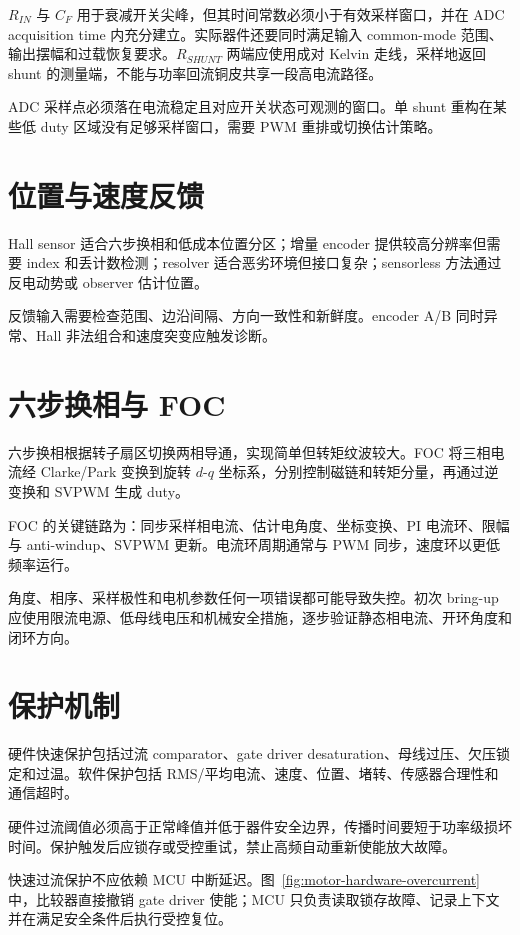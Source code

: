 $R_{IN}$ 与 $C_F$ 用于衰减开关尖峰，但其时间常数必须小于有效采样窗口，并在 ADC acquisition time 内充分建立。实际器件还要同时满足输入 common-mode 范围、输出摆幅和过载恢复要求。$R_{SHUNT}$ 两端应使用成对 Kelvin 走线，采样地返回 shunt 的测量端，不能与功率回流铜皮共享一段高电流路径。

ADC 采样点必须落在电流稳定且对应开关状态可观测的窗口。单 shunt 重构在某些低 duty 区域没有足够采样窗口，需要 PWM 重排或切换估计策略。

\section{位置与速度反馈}

Hall sensor 适合六步换相和低成本位置分区；增量 encoder 提供较高分辨率但需要 index 和丢计数检测；resolver 适合恶劣环境但接口复杂；sensorless 方法通过反电动势或 observer 估计位置。

反馈输入需要检查范围、边沿间隔、方向一致性和新鲜度。encoder A/B 同时异常、Hall 非法组合和速度突变应触发诊断。

\section{六步换相与 FOC}

六步换相根据转子扇区切换两相导通，实现简单但转矩纹波较大。FOC 将三相电流经 Clarke/Park 变换到旋转 $d$-$q$ 坐标系，分别控制磁链和转矩分量，再通过逆变换和 SVPWM 生成 duty。

FOC 的关键链路为：同步采样相电流、估计电角度、坐标变换、PI 电流环、限幅与 anti-windup、SVPWM 更新。电流环周期通常与 PWM 同步，速度环以更低频率运行。

角度、相序、采样极性和电机参数任何一项错误都可能导致失控。初次 bring-up 应使用限流电源、低母线电压和机械安全措施，逐步验证静态相电流、开环角度和闭环方向。

\section{保护机制}

硬件快速保护包括过流 comparator、gate driver desaturation、母线过压、欠压锁定和过温。软件保护包括 RMS/平均电流、速度、位置、堵转、传感器合理性和通信超时。

硬件过流阈值必须高于正常峰值并低于器件安全边界，传播时间要短于功率级损坏时间。保护触发后应锁存或受控重试，禁止高频自动重新使能放大故障。

快速过流保护不应依赖 MCU 中断延迟。图~\ref{fig:motor-hardware-overcurrent} 中，比较器直接撤销 gate driver 使能；MCU 只负责读取锁存故障、记录上下文并在满足安全条件后执行受控复位。

